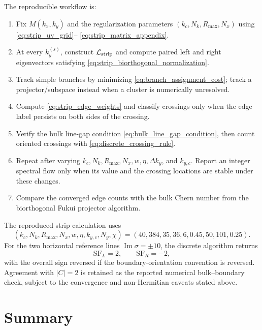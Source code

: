 \documentclass[11pt]{article}
\numberwithin{equation}{section}
\begin{document}
The reproducible workflow is:
\begin{enumerate}[label=\arabic*.]
  \item Fix $M(k_x,k_y)$ and the regularization parameters
  $(k_c,N_k,R_{\max},N_x)$ using \eqref{eq:strip_uv_grid}--
  \eqref{eq:strip_matrix_appendix}.
  \item At every $k_y^{(s)}$, construct $\mathcal L_{\rm strip}$ and compute
  paired left and right eigenvectors satisfying
  \eqref{eq:strip_biorthogonal_normalization}.
  \item Track simple branches by minimizing
  \eqref{eq:branch_assignment_cost}; track a projector/subspace instead
  when a cluster is numerically unresolved.
  \item Compute \eqref{eq:strip_edge_weights} and classify crossings only
  when the edge label persists on both sides of the crossing.
  \item Verify the bulk line-gap condition
  \eqref{eq:bulk_line_gap_condition}, then count oriented crossings with
  \eqref{eq:discrete_crossing_rule}.
  \item Repeat after varying $k_c,N_k,R_{\max},N_x,w,\eta,\Delta k_y$, and
  $k_{y,c}$.  Report an integer spectral flow only when its value and the
  crossing locations are stable under these changes.
  \item Compare the converged edge counts with the bulk Chern number from
  the biorthogonal Fukui projector algorithm.
\end{enumerate}
The reproduced strip calculation uses
\begin{equation}
  (k_c,N_k,R_{\max},N_x,w,\eta,k_{y,c},N_y,\chi)
  =(40,384,35,36,6,0.45,50,101,0.25).
  \label{eq:strip_reproduction_parameters}
\end{equation}
For the two horizontal reference lines
$\operatorname{Im}\sigma=\pm10$, the discrete algorithm returns
\begin{equation}
  \mathrm{SF}_{L}=2,
  \qquad
  \mathrm{SF}_{R}=-2,
\end{equation}
with the overall sign reversed if the boundary-orientation convention is
reversed.  Agreement with $|C|=2$ is retained as the reported numerical
bulk--boundary check, subject to the convergence and non-Hermitian caveats
stated above.

\section{Summary}
\end{document}
